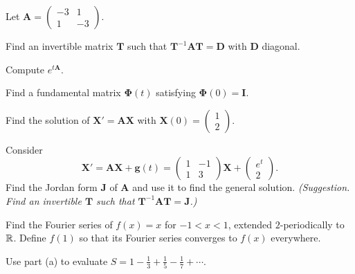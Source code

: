 \documentclass[11pt,oneside]{article}
\begin{document}
\begin{problem}
Let $\displaystyle\mathbf A=\begin{pmatrix}-3&1\\1&-3\end{pmatrix}$.
\begin{problemsubparts}
\item Find an invertible matrix $\mathbf T$ such that $\mathbf T^{-1}\mathbf A\mathbf T=\mathbf D$ with $\mathbf D$ diagonal.
\item Compute $e^{t\mathbf A}$.
\item Find a fundamental matrix $\boldsymbol{\Phi}(t)$ satisfying $\boldsymbol{\Phi}(0)=\mathbf I$.
\item Find the solution of $\mathbf X'=\mathbf A\mathbf X$ with $\displaystyle\mathbf X(0)=\begin{pmatrix}1\\2\end{pmatrix}$.
\end{problemsubparts}
\end{problem}

\begin{problem}
Consider
\[
\mathbf X'=\mathbf A\mathbf X+\mathbf g(t)
=\begin{pmatrix}1&-1\\1&3\end{pmatrix}\mathbf X+
\begin{pmatrix}e^t\\2\end{pmatrix}.
\]
Find the Jordan form $\mathbf J$ of $\mathbf A$ and use it to find the general solution. \textit{(Suggestion. Find an invertible $\mathbf T$ such that $\mathbf T^{-1}\mathbf A\mathbf T=\mathbf J$.)}
\end{problem}

\begin{problem}
\begin{problemsubparts}
\item Find the Fourier series of $f(x)=x$ for $-1<x<1$, extended $2$-periodically to $\mathbb{R}$. Define $f(1)$ so that its Fourier series converges to $f(x)$ everywhere.
\item Use part (a) to evaluate $\displaystyle S=1-\frac13+\frac15-\frac17+\cdots$.
\end{problemsubparts}
\end{problem}
\end{document}
